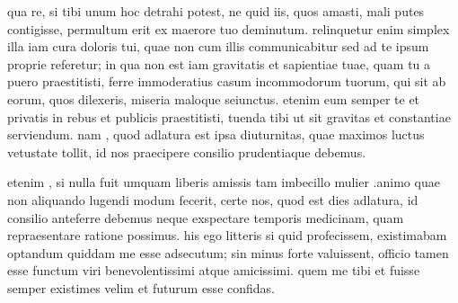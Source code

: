  qua re, si tibi unum hoc detrahi potest, ne quid iis, quos amasti, mali putes contigisse, permultum erit ex maerore tuo deminutum. relinquetur enim simplex illa iam cura doloris tui, quae non cum illis communicabitur sed ad te ipsum proprie referetur; in qua non est iam gravitatis et sapientiae tuae, quam tu a puero praestitisti, ferre immoderatius casum incommodorum tuorum, qui sit ab eorum, quos dilexeris, miseria maloque seiunctus. etenim eum semper te et privatis in rebus et publicis praestitisti, tuenda tibi ut sit gravitas et constantiae serviendum. nam , quod adlatura est ipsa diuturnitas, quae maximos luctus vetustate tollit, id nos praecipere consilio prudentiaque debemus.

 etenim , si nulla fuit umquam liberis amissis tam imbecillo mulier .animo quae non aliquando lugendi modum fecerit, certe nos, quod est dies adlatura, id consilio anteferre debemus neque exspectare temporis medicinam, quam repraesentare ratione possimus. his ego litteris si quid profecissem, existimabam optandum quiddam me esse adsecutum; sin minus forte valuissent, officio tamen esse functum viri benevolentissimi atque amicissimi. quem me tibi et fuisse semper existimes velim et futurum esse confidas.
